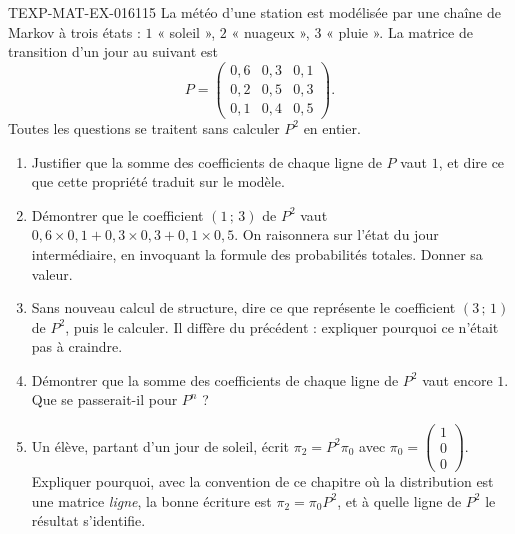 \begin{exercice}{TEXP-MAT-EX-016}{1}{15}
La météo d'une station est modélisée par une chaîne de Markov à trois états :
$1$ « soleil », $2$ « nuageux », $3$ « pluie ». La matrice de transition d'un
jour au suivant est
\[
  P=\begin{pmatrix}
    0{,}6 & 0{,}3 & 0{,}1\\
    0{,}2 & 0{,}5 & 0{,}3\\
    0{,}1 & 0{,}4 & 0{,}5
  \end{pmatrix}.
\]
Toutes les questions se traitent sans calculer $P^2$ en entier.
\begin{enumerate}
  \item Justifier que la somme des coefficients de chaque ligne de $P$ vaut $1$,
    et dire ce que cette propriété traduit sur le modèle.
  \item Démontrer que le coefficient $(1\,;\,3)$ de $P^2$ vaut
    $0{,}6\times 0{,}1+0{,}3\times 0{,}3+0{,}1\times 0{,}5$. On raisonnera sur
    l'état du jour intermédiaire, en invoquant la formule des probabilités
    totales. Donner sa valeur.
  \item Sans nouveau calcul de structure, dire ce que représente le coefficient
    $(3\,;\,1)$ de $P^2$, puis le calculer. Il diffère du précédent : expliquer
    pourquoi ce n'était pas à craindre.
  \item Démontrer que la somme des coefficients de chaque ligne de $P^2$ vaut
    encore $1$. Que se passerait-il pour $P^n$ ?
  \item Un élève, partant d'un jour de soleil, écrit $\pi_2=P^2\pi_0$ avec
    $\pi_0=\begin{pmatrix}1\\0\\0\end{pmatrix}$. Expliquer pourquoi, avec la
    convention de ce chapitre où la distribution est une matrice \emph{ligne},
    la bonne écriture est $\pi_2=\pi_0P^2$, et à quelle ligne de $P^2$ le
    résultat s'identifie.
\end{enumerate}
\end{exercice}
